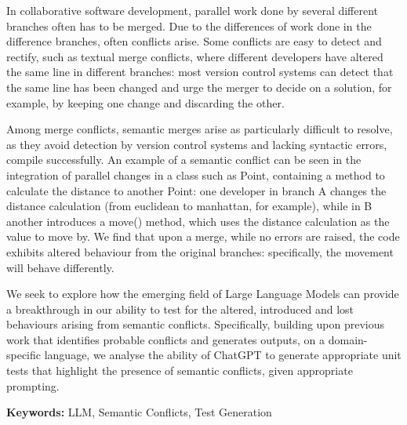 In collaborative software development, parallel work done by several different branches often has to be merged. Due to the differences of work done in the difference branches, often conflicts arise. Some conflicts are easy to detect and rectify, such as textual merge conflicts, where different developers have altered the same line in different branches: most version control systems can detect that the same line has been changed and urge the merger to decide on a solution, for example, by keeping one change and discarding the other.

Among merge conflicts, semantic merges arise as particularly difficult to resolve, as they avoid detection by version control systems and lacking syntactic errors, compile successfully.
An example of a semantic conflict can be seen in the integration of parallel changes in a class such as Point, containing a method to calculate the distance to another Point: one developer in branch A changes the distance calculation (from euclidean to manhattan, for example), while in B another introduces a move() method, which uses the distance calculation as the value to move by. We find that upon a merge, while no errors are raised, the code exhibits altered behaviour from the original branches: specifically, the movement will behave differently.

We seek to explore how the emerging field of Large Language Models can provide a breakthrough in our ability to test for the altered, introduced and lost behaviours arising from semantic conflicts. Specifically, building upon previous work that identifies probable conflicts and generates outputs, on a domain-specific language, we analyse the ability of ChatGPT to generate appropriate unit tests that highlight the presence of semantic conflicts, given appropriate prompting.

\bigskip\noindent
\textbf{Keywords:} LLM, Semantic Conflicts, Test Generation
